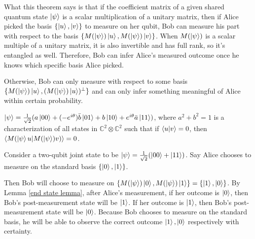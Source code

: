 What this theorem says is that if the coefficient matrix of a given shared quantum state $\ket{\psi}$ is a scalar multiplication of a unitary matrix, then if Alice picked the basis $\{\ket{u}, \ket{v}\}$ to measure on her qubit, Bob can measure his part with respect to the basis $\{M(\ket{\psi})\ket{u}, M(\ket{\psi})\ket{v}\}$. When $M(\ket{\psi})$ is a scalar multiple of a unitary matrix, it is also invertible and has full rank, so it's entangled as well. Therefore, Bob can infer Alice's measured outcome once he knows which specific basis Alice picked.

Otherwise, Bob can only measure with respect to some basis $\{M(\ket{\psi})\ket{u}, (M(\ket{\psi})\ket{u})^\perp \}$ and can only infer something meaningful of Alice within certain probability.


\begin{corollary}
$\ket{\psi}=\frac{1}{\sqrt{2}}(a\ket{00}+(-e^{i\theta})\Bar{b}\ket{01}+b\ket{10}+e^{i\theta}\Bar{a}\ket{11})$, where $a^2+b^2=1$ is a characterization of all states in $\mathbb{C}^2 \otimes \mathbb{C}^2$ such that if $\braket{u|v}=0$, then $\braket{M(\ket{\psi}u|M(\ket{\psi})v)}=0$.
\end{corollary}

\begin{example}
Consider a two-qubit joint state to be $\ket{\psi}=\frac{1}{\sqrt{2}}(\ket{00}+\ket{11})$. Say Alice chooses to measure on the standard basis $\{\ket{0}, \ket{1}\}$.
\end{example}
Then Bob will choose to measure on $\{M(\ket{\psi})\ket{0}, M(\ket{\psi})\ket{1}\}=\{\ket{1}, \ket{0}\}$. By Lemma \ref{end state lemma}, after Alice's measurement, if her outcome is $\ket{0}$, then Bob's post-measurement state will be $\ket{1}$. If her outcome is $\ket{1}
$, then Bob's post-measurement state will be $\ket{0}$. Because Bob chooses to measure on the standard basis, he will be able to observe the correct outcome $\ket{1}, \ket{0}$ respectively with certainty.

